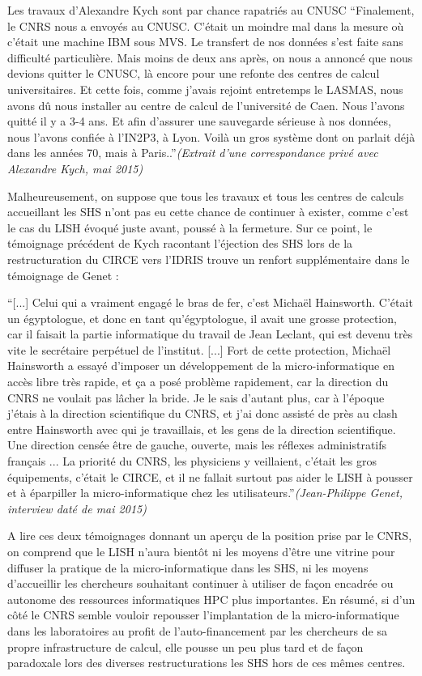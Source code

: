 Les travaux d'Alexandre Kych sont par chance rapatriés au CNUSC \enquote{Finalement, le CNRS nous a envoyés au CNUSC. C'était un moindre mal dans la mesure où c'était une machine IBM sous MVS. Le transfert de nos données s'est faite sans difficulté particulière. Mais moins de deux ans après, on nous a annoncé que nous devions quitter le CNUSC, là encore pour une refonte des centres de calcul universitaires. Et cette fois, comme j'avais rejoint entretemps le LASMAS, nous avons dû nous installer au centre de calcul de l'université de Caen. Nous l'avons quitté il y a 3-4 ans. Et afin d'assurer une sauvegarde sérieuse à nos données, nous l'avons confiée à l'IN2P3, à Lyon. Voilà un gros système dont on parlait déjà dans les années 70, mais à Paris..}\textit{(Extrait d'une correspondance privé avec Alexandre Kych, mai 2015)}

Malheureusement, on suppose que tous les travaux et tous les centres de calculs accueillant les SHS n'ont pas eu cette chance de continuer à exister, comme c'est le cas du LISH évoqué juste avant, poussé à la fermeture. Sur ce point, le témoignage précédent de Kych racontant l'éjection des SHS lors de la restructuration du CIRCE vers l'IDRIS trouve un renfort supplémentaire dans le témoignage de Genet :

\enquote{[...] Celui qui a vraiment engagé le bras de fer, c'est Michaël Hainsworth. C'était un égyptologue, et donc en tant qu'égyptologue, il avait une grosse protection, car il faisait la partie informatique du travail de Jean Leclant, qui est devenu très vite le secrétaire perpétuel de l'institut. [...] Fort de cette protection, Michaël Hainsworth a essayé d'imposer un développement de la micro-informatique en accès libre très rapide, et ça a posé problème rapidement, car la direction du CNRS ne voulait pas lâcher la bride. Je le sais d'autant plus, car à l'époque j'étais à la direction scientifique du CNRS, et j'ai donc assisté de près au clash entre Hainsworth avec qui je travaillais, et les gens de la direction scientifique. Une direction censée être de gauche, ouverte, mais les réflexes administratifs français ... La priorité du CNRS, les physiciens y veillaient, c'était les gros équipements, c'était le CIRCE, et il ne fallait surtout pas aider le LISH à pousser et à éparpiller la micro-informatique chez les utilisateurs.}\textit{(Jean-Philippe Genet, interview daté de mai 2015)}

A lire ces deux témoignages donnant un aperçu de la position prise par le CNRS, on comprend que le LISH n'aura bientôt ni les moyens d'être une vitrine pour diffuser la pratique de la micro-informatique dans les SHS, ni les moyens d'accueillir les chercheurs souhaitant continuer à utiliser de façon encadrée ou autonome des ressources informatiques HPC plus importantes. En résumé, si d'un côté le CNRS semble vouloir repousser l'implantation de la micro-informatique dans les laboratoires au profit de l'auto-financement par les chercheurs de sa propre infrastructure de calcul, elle pousse un peu plus tard et de façon paradoxale lors des diverses restructurations les SHS hors de ces mêmes centres.


